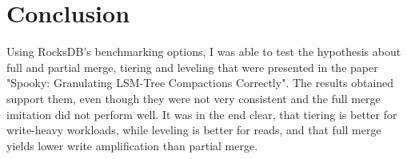 \documentclass[sigconf]{acmart}
\begin{document}
 \section{Conclusion}

 Using RocksDB's benchmarking options, I was able to test the hypothesis about full and partial merge, tiering and leveling that were presented in the paper "Spooky: Granulating LSM-Tree Compactions Correctly"\cite{Spooky}. The results obtained support them, even though they were not very consistent and the full merge imitation did not perform well. It was in the end clear, that tiering is better for write-heavy workloads, while leveling is better for reads, and that full merge yields lower write amplification than partial merge.



\end{document}
